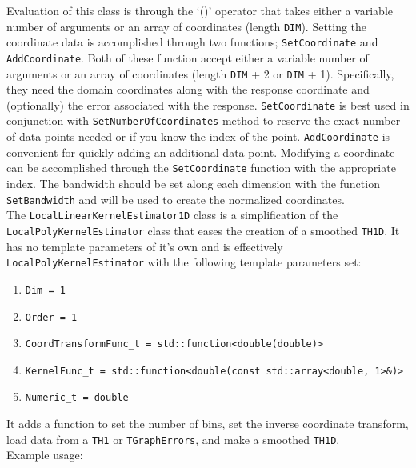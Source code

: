Evaluation of this class is through the `()' operator that takes either
a variable number of arguments or an array of coordinates (length
\texttt{DIM}). Setting the coordinate data is accomplished through two
functions; \texttt{SetCoordinate} and \texttt{AddCoordinate}. Both of
these function accept either a variable number of arguments or an array
of coordinates (length \texttt{DIM} + 2 or \texttt{DIM} + 1).
Specifically, they need the domain coordinates along with the response
coordinate and (optionally) the error associated with the response.
\texttt{SetCoordinate} is best used in conjunction with
\texttt{SetNumberOfCoordinates} method to reserve the exact number of
data points needed or if you know the index of the point.
\texttt{AddCoordinate} is convenient for quickly adding an additional
data point. Modifying a coordinate can be accomplished through the
\texttt{SetCoordinate} function with the appropriate index. The
bandwidth should be set along each dimension with the function
\texttt{SetBandwidth} and will be used to create the normalized
coordinates.\\The \texttt{LocalLinearKernelEstimator1D} class is a
simplification of the \texttt{LocalPolyKernelEstimator} class that eases
the creation of a smoothed \texttt{TH1D}. It has no template parameters
of it's own and is effectively \texttt{LocalPolyKernelEstimator} with
the following template parameters set:

\begin{enumerate}
\def\labelenumi{\arabic{enumi}.}
\itemsep1pt\parskip0pt
\item
  \texttt{Dim = 1}
\item
  \texttt{Order = 1}
\item
  \texttt{CoordTransformFunc\_t = std::function\textless{}double(double)\textgreater{}}
\item
  \texttt{KernelFunc\_t = std::function\textless{}double(const std::array\textless{}double, 1\textgreater{}\&)\textgreater{}}
\item
  \texttt{Numeric\_t = double}
\end{enumerate}

It adds a function to set the number of bins, set the inverse coordinate
transform, load data from a \texttt{TH1} or \texttt{TGraphErrors}, and
make a smoothed \texttt{TH1D}.\\Example usage:

